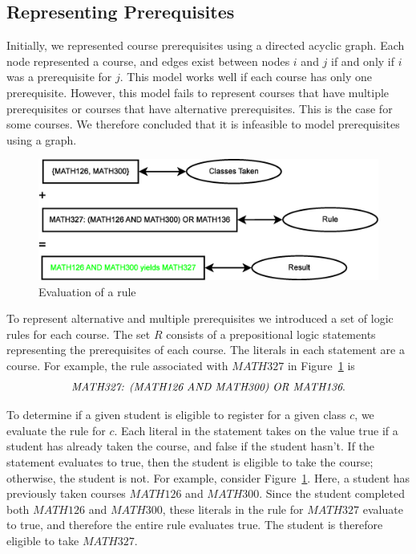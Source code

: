 \documentclass[11pt]{article} %
\begin{document}
\subsection{Representing Prerequisites} Initially, we represented course
prerequisites using a directed acyclic graph.  Each node represented a course, and edges
exist between nodes $i$ and $j$ if and only if $i$ was a prerequisite for $j$.
This model works well if each course has only one prerequisite.  However,
this model fails to represent courses that have multiple prerequisites
or courses that have alternative prerequisites.  This is the case for some courses.
We therefore concluded that it is infeasible to model prerequisites using a graph.
\begin{figure} [ht] 
    \begin{center}
        \includegraphics[scale=0.4]{prereq_logic_example} 
    \end{center}
    \caption{Evaluation of a rule} 
    \label{logic_ex} 
\end{figure}

To represent alternative and multiple prerequisites we introduced a set of logic
rules for each course.  The set $R$ consists of a prepositional logic statements
representing the prerequisites of each course.  The literals in each statement
are a course.  For example, the rule associated with $MATH327$ in
Figure~\ref{logic_ex} is $$ \text{{\it MATH327: (MATH126 AND MATH300) OR
MATH136}}.$$

To determine if a given student is eligible to register for a given class $c$,
we evaluate the rule for $c$.  Each literal in the statement takes on
the value true if a student has already taken the course, and false if the student
hasn't.  If the statement evaluates to true, then the student is eligible to take the
course; otherwise, the student is not.  For example, consider Figure~\ref{logic_ex}.  Here, a student
has previously taken courses $MATH126$ and $MATH300$.  Since the student completed both $MATH126$ and
$MATH300$, these literals in the rule for $MATH327$ evaluate to true,
and therefore the entire rule evaluates true.  The student is therefore eligible to take $MATH327$.
\end{document}
